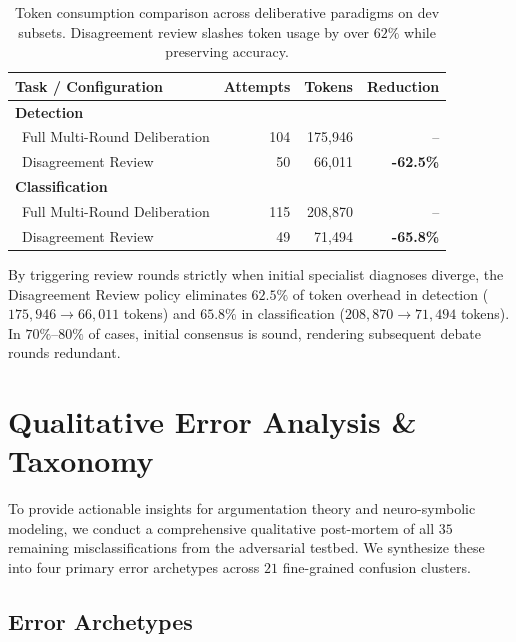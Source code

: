 \documentclass[11pt]{article}
\begin{document}
\begin{table}[h]
\centering
\small
\begin{tabular}{lrrr}
\toprule
\textbf{Task / Configuration} & \textbf{Attempts} & \textbf{Tokens} & \textbf{Reduction} \\
\midrule
\textbf{Detection} & & & \\
~Full Multi-Round Deliberation & 104 & 175,946 & -- \\
~Disagreement Review & 50 & 66,011 & \textbf{-62.5\%} \\
\midrule
\textbf{Classification} & & & \\
~Full Multi-Round Deliberation & 115 & 208,870 & -- \\
~Disagreement Review & 49 & 71,494 & \textbf{-65.8\%} \\
\bottomrule
\end{tabular}
\caption{Token consumption comparison across deliberative paradigms on dev subsets. Disagreement review slashes token usage by over $62\%$ while preserving accuracy.}
\label{tab:token_efficiency}
\end{table}

By triggering review rounds strictly when initial specialist diagnoses diverge, the Disagreement Review policy eliminates $62.5\%$ of token overhead in detection ($175{,}946 \to 66{,}011$ tokens) and $65.8\%$ in classification ($208{,}870 \to 71{,}494$ tokens). In $70\%$--$80\%$ of cases, initial consensus is sound, rendering subsequent debate rounds redundant.

\section{Qualitative Error Analysis \& Taxonomy}

To provide actionable insights for argumentation theory and neuro-symbolic modeling, we conduct a comprehensive qualitative post-mortem of all $35$ remaining misclassifications from the adversarial testbed. We synthesize these into four primary error archetypes across $21$ fine-grained confusion clusters.

\subsection{Error Archetypes}
\end{document}
